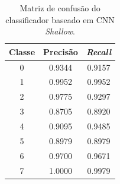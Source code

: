 \begin{table}[H]
	\centering
\begin{tabular}{c|c|c}
	\textbf{Classe} & \textbf{Precisão} & \textit{\textbf{Recall}} \\ \hline
	0               & 0.9344            & 0.9157                   \\
	1               & 0.9952            & 0.9952                   \\
	2               & 0.9775            & 0.9297                   \\
	3               & 0.8705            & 0.8920                   \\
	4               & 0.9095            & 0.9485                   \\
	5               & 0.8979            & 0.8979                   \\
	6               & 0.9700            & 0.9671                   \\
	7               & 1.0000            & 0.9979                  
\end{tabular}
	\caption{Matriz de confusão do classificador baseado em CNN \textit{Shallow}.}
	\label{tab:pr_CNN_deep}
\end{table}

